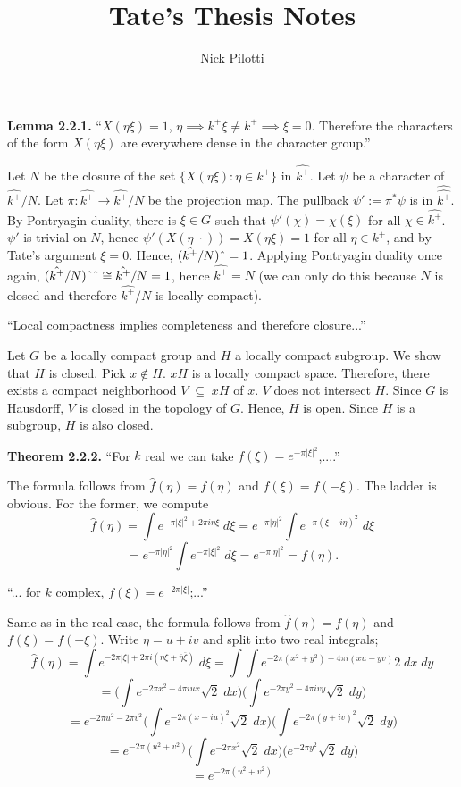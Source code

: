 \documentclass[12pt, letterpaper, twoside]
{article}
\title{Tate's Thesis Notes}
\author{Nick Pilotti}
\newcommand{\ra}{\rightarrow}
\newcommand{\sub}{{\; \subseteq \;}} %
\newcommand{\ol}{\overline}
\begin{document}
\maketitle

\textbf{Lemma 2.2.1.}
``$X(\eta \xi) = 1$,  $\eta \implies k^+ \xi \neq k^+ \implies \xi =
0$. Therefore the characters of the form $X(\eta \xi)$ are everywhere dense in
the character group.'' 

Let $N$ be the closure of the set $\{X(\eta \xi) : \eta \in k^+\}$ in
$\hat{k^+}$. Let $\psi$ be a character of $\hat{k^+}/N$. Let $\pi : \hat{k^+}
\ra \hat{k^+}/N$ be the projection map. The pullback $\psi' := \pi^*\psi$ is in
$\hat{\hat{k^+}}$. By Pontryagin duality, there is $\xi \in G$ such that
$\psi'(\chi) = \chi(\xi)$ for all $\chi \in \hat{k^+}$. $\psi'$ is trivial on
$N$, hence $\psi'(X(\eta \; \cdot )) = X(\eta \xi) = 1$ for all $\eta \in k^+$,
and by Tate's argument $\xi = 0$. Hence, $(\hat{k^+}/N)\string^ = 1$. Applying
Pontryagin duality once again, $(\hat{k^+}/N)\string^\string^ \cong \hat{k^+}/N
= 1$, hence $\hat{k^+} = N$ (we can only do this because $N$ is closed and
therefore $\hat{k^+}/N$ is locally compact).

``Local compactness implies completeness and therefore closure...''

Let $G$ be a locally compact group and $H$ a locally compact subgroup. We show
that $H$ is closed. Pick $x \not\in H$. $xH$ is a locally compact space.
Therefore, there exists a compact neighborhood $V \sub xH$ of $x$. $V$ does not
intersect $H$. Since $G$ is Hausdorff, $V$ is closed in the topology of $G$.
Hence, $H$ is open. Since $H$ is a subgroup, $H$ is also closed.

\textbf{Theorem 2.2.2.} ``For $k$ real we can take $f(\xi) =
e^{-\pi|\xi|^2}$,....''

The formula follows from $\hat{f}(\eta) = f(\eta)$ and $f(\xi) = f(-\xi)$. The
ladder is obvious. For the former, we compute
\[\hat{f}(\eta) = \int e^{-\pi|\xi|^2 + 2\pi i\eta \xi} \; d \xi =
e^{-\pi|\eta|^2} \int e^{-\pi(\xi - i\eta)^2} \; d \xi\]
\[= e^{-\pi|\eta|^2} \int e^{-\pi |\xi|^2} \; d \xi = e^{-\pi|\eta|^2} =
f(\eta).\]

``... for $k$ complex, $f(\xi) = e^{-2\pi|\xi|}$;...''

Same as in the real case, the formula follows from $\hat{f}(\eta) = f(\eta)$ and
$f(\xi) = f(-\xi)$. Write $\eta = u + iv$ and split into two real integrals;
\[\hat{f}(\eta) = \int e^{-2\pi|\xi| + 2\pi i (\eta\xi + \ol{\eta}\ol{\xi})} \;
d \xi = \int \int e^{-2\pi(x^2 + y^2) + 4\pi i(xu - yv)} 2 \; dx \; dy \]
\[= \bigg( \int e^{-2\pi x^2 + 4\pi i u x} \sqrt{2} \; dx \bigg) \bigg( \int
e^{-2\pi y^2 - 4\pi i v y} \sqrt{2} \; dy \bigg)\]
\[= e^{-2\pi u^2 - 2\pi v^2} \bigg( \int e^{-2\pi(x - iu)^2} \sqrt{2} \; dx
\bigg) \bigg( \int e^{-2\pi(y + iv)^2} \sqrt{2} \; dy \bigg)\]
\[= e^{-2\pi(u^2 + v^2)} \bigg( \int e^{-2\pi x^2} \sqrt{2} \; dx \bigg) \bigg(
e^{-2\pi y^2} \sqrt{2} \; dy\bigg)\]
\[= e^{-2\pi(u^2 + v^2)}\]
\end{document}
